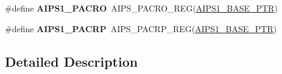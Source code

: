 \begin{DoxyCompactItemize}
\item 
\hypertarget{group___a_i_p_s___register___accessor___macros_ga52d5b9830bfd7cbaaba6599ceb788a74}{}\#define {\bfseries A\+I\+P\+S1\+\_\+\+P\+A\+C\+R\+O}~A\+I\+P\+S\+\_\+\+P\+A\+C\+R\+O\+\_\+\+R\+E\+G(\hyperlink{group___a_i_p_s___peripheral_gab38278851053aa66f9683ed8707e23bc}{A\+I\+P\+S1\+\_\+\+B\+A\+S\+E\+\_\+\+P\+T\+R})\label{group___a_i_p_s___register___accessor___macros_ga52d5b9830bfd7cbaaba6599ceb788a74}

\item 
\hypertarget{group___a_i_p_s___register___accessor___macros_gad8012e5cb4cf7d6dfb0e76e11974d4d0}{}\#define {\bfseries A\+I\+P\+S1\+\_\+\+P\+A\+C\+R\+P}~A\+I\+P\+S\+\_\+\+P\+A\+C\+R\+P\+\_\+\+R\+E\+G(\hyperlink{group___a_i_p_s___peripheral_gab38278851053aa66f9683ed8707e23bc}{A\+I\+P\+S1\+\_\+\+B\+A\+S\+E\+\_\+\+P\+T\+R})\label{group___a_i_p_s___register___accessor___macros_gad8012e5cb4cf7d6dfb0e76e11974d4d0}

\end{DoxyCompactItemize}


\subsection{Detailed Description}
